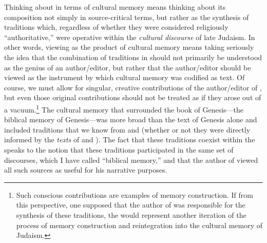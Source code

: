 Thinking about \ga in terms of cultural memory means thinking about its composition not simply in source-critical terms, but rather as the synthesis of traditions which, regardless of whether they were considered religiously ``authoritative,'' were operative within the \emph{cultural discourse} of late \secondtemple Judaism. In other words, viewing \ga as the product of cultural memory means taking seriously the idea that the combination of traditions in \ga should not primarily be understood as the genius of an author/editor, but rather that the author/editor should be viewed as the instrument by which cultural memory was codified as text. Of course, we must allow for singular, creative contributions of the author/editor of \ga, but even those original contributions should not be treated as if they arose out of a vacuum.\footnote{Such conscious contributions are examples of memory construction. If from this perspective, one supposed that the author of \ga was responsible for the synthesis of these traditions, the \ga would represent another iteration of the process of memory construction and reintegration into the cultural memory of \secondtemple Judaism.} The cultural memory that surrounded the book of Genesis---the biblical memory of Genesis---was more broad than the text of Genesis alone and included traditions that we know from \jub and \firstenoch (whether or not they were directly informed by the \emph{texts} of \jub and \firstenoch). The fact that these traditions coexist within the \ga speaks to the notion that these traditions participated in the same set of discourses, which I have called ``biblical memory,'' and that the author of \ga viewed all such sources as useful for his narrative purposes.